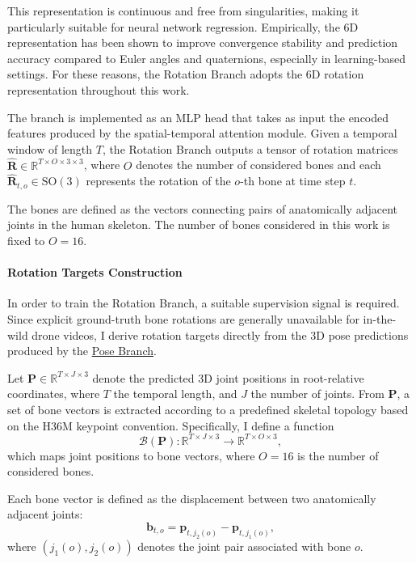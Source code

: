 This representation is continuous and free from singularities, making it particularly suitable for neural network regression.
Empirically, the 6D representation has been shown to improve convergence stability and prediction accuracy compared to Euler angles and quaternions, especially in learning-based settings.
For these reasons, the Rotation Branch adopts the 6D rotation representation throughout this work.

The branch is implemented as an MLP head that takes as input the encoded features produced by the spatial-temporal attention module. Given a temporal window of length $T$, the Rotation Branch outputs a tensor of rotation matrices $\mathbf{\hat{R}} \in \mathbb{R}^{T \times O \times 3 \times 3}$,
where $O$ denotes the number of considered bones and each $\mathbf{\hat{R}}_{t,o} \in \mathrm{SO}(3)$ represents the rotation of the $o$-th bone at time step $t$.

The bones are defined as the vectors connecting pairs of anatomically adjacent joints in the human skeleton. The number of bones considered in this work is fixed to $O = 16$.

\paragraph{Rotation Targets Construction}
In order to train the Rotation Branch, a suitable supervision signal is required. Since explicit ground-truth bone rotations are generally unavailable for in-the-wild drone videos, I derive rotation targets directly from the 3D pose 
predictions produced by the \hyperref[sec:pose3d_branch]{Pose Branch}.

Let $\mathbf{P} \in \mathbb{R}^{T \times J \times 3}$ denote the predicted 3D joint positions in root-relative coordinates, where $T$ the temporal length, and $J$ the number of joints. From $\mathbf{P}$, a set of bone vectors is 
extracted according to a predefined skeletal topology based on the H36M keypoint convention. Specifically, I define a function
\begin{equation}
    \mathcal{B}(\mathbf{P}) : \mathbb{R}^{T \times J \times 3} \rightarrow \mathbb{R}^{T \times O \times 3},
\end{equation}
which maps joint positions to bone vectors, where $O = 16$ is the number of considered bones.

Each bone vector is defined as the displacement between two anatomically adjacent joints:
\begin{equation}
    \mathbf{b}_{t,o} = \mathbf{p}_{t,j_2(o)} - \mathbf{p}_{t,j_1(o)},
\end{equation}
where $(j_1(o), j_2(o))$ denotes the joint pair associated with bone $o$.

